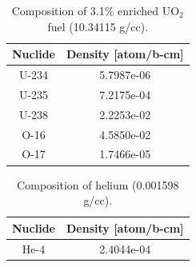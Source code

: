\begin{appendices}
\begin{table}[h!]
  \centering
  \caption[BEAVRS isotopic composition for 3.1\% enriched UO$_2$]{Composition of 3.1\% enriched UO$_2$ fuel (10.34115 g/cc).}
  \footnotesize
  \label{table:chap7-beavrs-isotopes-3.1-uo2}
  \vspace{6pt}
  \begin{tabular}{c c}
  \toprule
  \rowcolor{lightgray}
  {\bf Nuclide} &
  {\bf Density [atom/b-cm]} \\
  \midrule
  U-234 & 5.7987e-06 \\
  U-235 & 7.2175e-04 \\
  U-238 & 2.2253e-02 \\
  O-16 & 4.5850e-02 \\
  O-17 & 1.7466e-05 \\
  \bottomrule
\end{tabular}
\end{table}

\begin{table}[h!]
  \centering
  \caption[BEAVRS isotopic composition for helium]{Composition of helium (0.001598 g/cc).}
  \footnotesize
  \label{table:chap7-beavrs-isotopes-3.1-helium}
  \vspace{6pt}
  \begin{tabular}{c c}
  \toprule
  \rowcolor{lightgray}
  {\bf Nuclide} &
  {\bf Density [atom/b-cm]} \\
  \midrule
  He-4 & 2.4044e-04 \\
  \bottomrule
\end{tabular}
\end{table}


\end{appendices}
